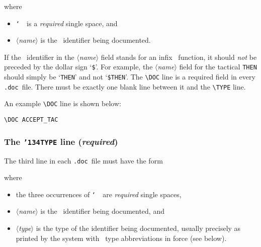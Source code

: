 \documentclass[12pt]{article}
\def\doc{{\tt .doc}}
\def\vsp{{\tt\char`\ }}
\def\meta#1{\(\langle\){\it #1}\(\rangle\)}
\begin{document}
\noindent where

\begin{itemize}

\item \vsp\ is a {\it required\/} single space, and

\item \meta{name} is the \ML\ identifier being documented.

\end{itemize}

\noindent If the \ML\ identifier in the \meta{name} field stands for an infix
\ML\ function, it should {\it not\/} be preceded by the dollar sign
`{\small\verb!$!}'.  For example, the \meta{name} field for the tactical
{\small\verb!THEN!} should simply be `{\small\verb!THEN!}' and not
`{\small\verb!$THEN!}'.  The {\small\verb!\DOC!} line is a required field in
every \doc\ file.  There must be exactly one blank line between it and the
{\small\verb!\TYPE!} line.

An example {\small\verb!\DOC!} line is shown below:

\begin{holboxed}\begin{verbatim}
\DOC ACCEPT_TAC
\end{verbatim}\end{holboxed}

\subsubsection{The {\tt {\char'134}TYPE} line ({\it required})}

The third line in each \doc\ file must have the form

\medskip
\noindent\qquad{\small\verb!\TYPE!\vsp\verb!{!\meta{name}\vsp\ml{:}\vsp\meta{type}\verb!}!}
\medskip

\noindent where

\begin{itemize}

\item the three occurrences of \vsp\ are {\it required\/} single spaces,
\item \meta{name} is the \ML\ identifier being documented, and
\item \meta{type} is the type of the identifier being documented, usually
precisely as printed by the system with \ML\ type abbreviations in force (see
below).

\end{itemize}
\end{document}
